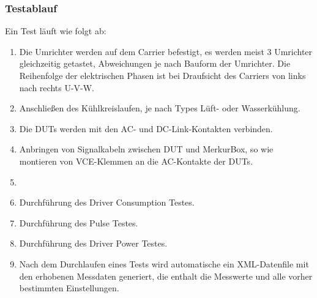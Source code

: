 \subsubsection{Testablauf}

Ein Test läuft wie folgt ab:

\begin{enumerate}
\item Die Umrichter werden auf dem Carrier befestigt, es werden meist 3 Umrichter gleichzeitig getastet, Abweichungen je nach Bauform der Umrichter.
Die Reihenfolge der elektrischen Phasen ist bei Draufsicht des Carriers von links nach rechts U-V-W.
\item Anschließen des Kühlkreislaufen, je nach Types Lüft- oder Wasserkühlung.
\item Die \ac{DUTs} werden mit den AC- und DC-Link-Kontakten verbinden.
\item Anbringen von Signalkabeln zwischen DUT und MerkurBox, so wie montieren von VCE-Klemmen an die AC-Kontakte der DUTs.
\item
\item Durchführung des Driver Consumption Testes.
\item Durchführung des Pulse Testes.
\item Durchführung des Driver Power Testes.
\item Nach dem Durchlaufen eines Tests wird automatische ein XML-Datenfile mit den erhobenen Messdaten generiert, die enthalt die Messwerte und alle vorher bestimmten Einstellungen.
\end{enumerate}

